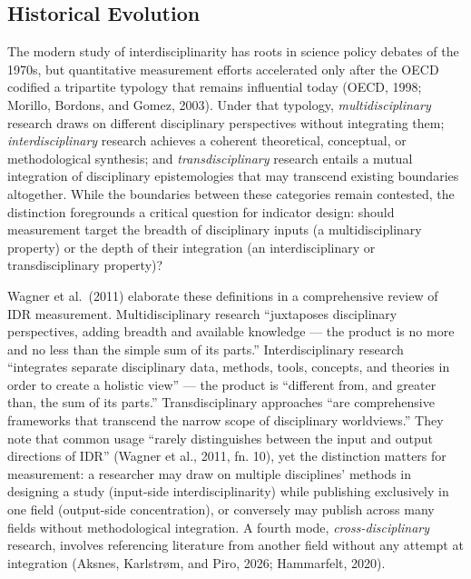 \documentclass[
]{article}
\begin{document}
\hypertarget{historical-evolution}{%
\subsection{Historical Evolution}\label{historical-evolution}}

The modern study of interdisciplinarity has roots in science policy
debates of the 1970s, but quantitative measurement efforts accelerated
only after the OECD codified a tripartite typology that remains
influential today (OECD, 1998; Morillo, Bordons, and Gomez, 2003). Under
that typology, \emph{multidisciplinary} research draws on different
disciplinary perspectives without integrating them;
\emph{interdisciplinary} research achieves a coherent theoretical,
conceptual, or methodological synthesis; and \emph{transdisciplinary}
research entails a mutual integration of disciplinary epistemologies
that may transcend existing boundaries altogether. While the boundaries
between these categories remain contested, the distinction foregrounds a
critical question for indicator design: should measurement target the
breadth of disciplinary inputs (a multidisciplinary property) or the
depth of their integration (an interdisciplinary or transdisciplinary
property)?

Wagner et al.~(2011) elaborate these definitions in a comprehensive
review of IDR measurement. Multidisciplinary research ``juxtaposes
disciplinary perspectives, adding breadth and available knowledge ---
the product is no more and no less than the simple sum of its parts.''
Interdisciplinary research ``integrates separate disciplinary data,
methods, tools, concepts, and theories in order to create a holistic
view'' --- the product is ``different from, and greater than, the sum of
its parts.'' Transdisciplinary approaches ``are comprehensive frameworks
that transcend the narrow scope of disciplinary worldviews.'' They note
that common usage ``rarely distinguishes between the input and output
directions of IDR'' (Wagner et al., 2011, fn. 10), yet the distinction
matters for measurement: a researcher may draw on multiple disciplines'
methods in designing a study (input-side interdisciplinarity) while
publishing exclusively in one field (output-side concentration), or
conversely may publish across many fields without methodological
integration. A fourth mode, \emph{cross-disciplinary} research, involves
referencing literature from another field without any attempt at
integration (Aksnes, Karlstrøm, and Piro, 2026; Hammarfelt, 2020).
\end{document}
